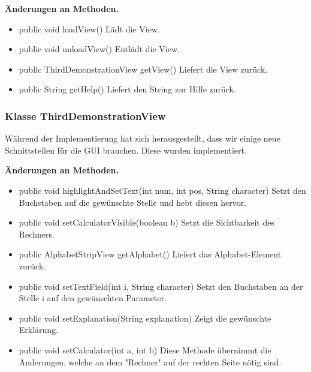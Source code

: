 \documentclass{article}
\begin{document}
    \textbf{Änderungen an Methoden.}
      \begin{itemize}
		\item public void loadView()\newline
              Lädt die View.
        \item public void unloadView()\newline
              Entlädt die View.
        \item public ThirdDemonstrationView getView()\newline
              Liefert die View zurück.
        \item public String getHelp()\newline
              Liefert den String zur Hilfe zurück.
      \end{itemize}

    \subsubsection{Klasse ThirdDemonstrationView}
	Während der Implementierung hat sich herausgestellt, dass wir einige neue Schnittstellen für die GUI brauchen. Diese wurden implementiert.\newline
           
    \textbf{Änderungen an Methoden.}
      \begin{itemize}
		\item public void highlightAndSetText(int num, int pos, String character)\newline
              Setzt den Buchstaben auf die gewünschte Stelle und hebt diesen hervor.
		\item public void setCalculatorVisible(boolean b)\newline
              Setzt die Sichtbarkeit des Rechners.
		\item public AlphabetStripView getAlphabet()\newline
              Liefert das Alphabet-Element zurück.
		\item public void setTextField(int i, String character)\newline
              Setzt den Buchstaben an der Stelle i auf den gewünschten Parameter.
		\item public void setExplanation(String explanation)\newline
              Zeigt die gewünschte Erklärung.
		\item public void setCalculator(int a, int b)\newline
              Diese Methode übernimmt die Änderungen, welche an dem "Rechner" auf der rechten Seite nötig sind.
	  \end{itemize}
	  
\end{document}
